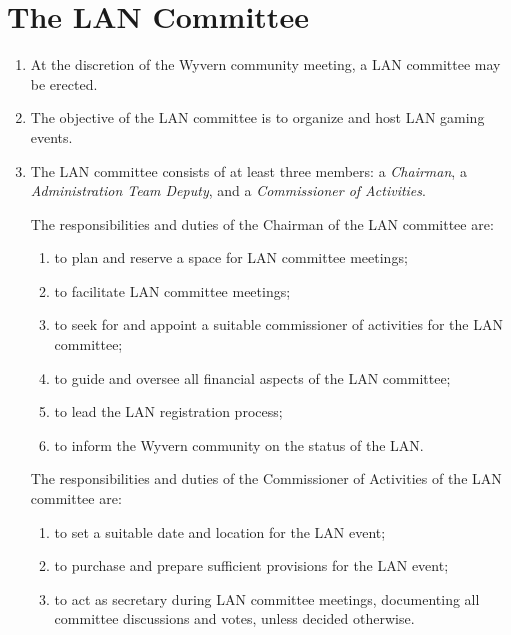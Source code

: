 \section{The LAN Committee}

\begin{enumerate}
	\item At the discretion of the Wyvern community meeting, a LAN committee may be erected.
	
    \item The objective of the LAN committee is to organize and host LAN gaming events.
    
	\item The LAN committee consists of at least three members: a \textit{Chairman}, a \textit{Administration Team Deputy}, and a \textit{Commissioner of Activities}.

    \begin{item}
        The responsibilities and duties of the Chairman of the LAN committee are:
        \begin{enumerate}
            \item to plan and reserve a space for LAN committee meetings;
            \item to facilitate LAN committee meetings;
            \item to seek for and appoint a suitable commissioner of activities for the LAN committee;
            \item to guide and oversee all financial aspects of the LAN committee;
            \item to lead the LAN registration process;
            \item to inform the Wyvern community on the status of the LAN.
        \end{enumerate}
    \end{item}
    
    \begin{item}
        The responsibilities and duties of the Commissioner of Activities of the LAN committee are:
        \begin{enumerate}
            \item to set a suitable date and location for the LAN event;
            \item to purchase and prepare sufficient provisions for the LAN event;
            \item to act as secretary during LAN committee meetings, documenting all committee discussions and votes, unless decided otherwise.
        \end{enumerate}
    \end{item}
    

\end{enumerate}

